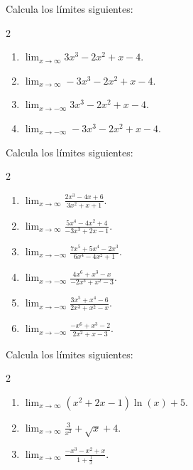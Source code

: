 \documentclass[12pt,a4paper]{book}
\begin{document}
    \begin{ejercicio}\label{ej:180}
        Calcula los límites siguientes:
        \begin{multicols}{2}
        \begin{enumerate}[nosep]
            \item $\lim_{x\to\infty}3x^{3}-2x^{2}+x-4$.
            \item $\lim_{x\to\infty}-3x^{3}-2x^{2}+x-4$.
            \item $\lim_{x\to-\infty}3x^{3}-2x^{2}+x-4$.
            \item $\lim_{x\to-\infty}-3x^{3}-2x^{2}+x-4$.
        \end{enumerate}
        \end{multicols}
    \end{ejercicio}

    \begin{ejercicio}\label{ej:181}
        Calcula los límites siguientes:
        \begin{multicols}{2}
        \begin{enumerate}[nosep]
            \item $\lim_{x\to\infty}\frac{2x^{3}-4x+6}{3x^{2}+x+1}$.
            \item $\lim_{x\to\infty}\frac{5x^{4}-4x^{2}+4}{-3x^{3}+2x-1}$.
            \item $\lim_{x\to-\infty}\frac{7x^{5}+5x^{4}-2x^{3}}{6x^{4}-4x^{2}+1}$.
            \item $\lim_{x\to-\infty}\frac{4x^{6}+x^{3}-x}{-2x^{3}+x^{2}-3}$.
            \item $\lim_{x\to-\infty}\frac{3x^{5}+x^{4}-6}{2x^{3}+x^{2}-x}$.
            \item $\lim_{x\to-\infty}\frac{-x^{6}+x^{3}-2}{2x^{2}+x-3}$.
        \end{enumerate}
        \end{multicols}
    \end{ejercicio}

    \begin{ejercicio}\label{ej:182}
        Calcula los límites siguientes:
        \begin{multicols}{2}
        \begin{enumerate}[nosep]
            \item $\lim_{x\to\infty}\left(x^{2}+2x-1\right)\ln(x)+5$.
            \item $\lim_{x\to\infty}\frac{3}{x^{2}}+\sqrt{x}+4$.
            \item $\lim_{x\to\infty}\frac{-x^{3}-x^{2}+x}{1+\frac{1}{x}}$.
        \end{enumerate}
        \end{multicols}
    \end{ejercicio}
\end{document}
